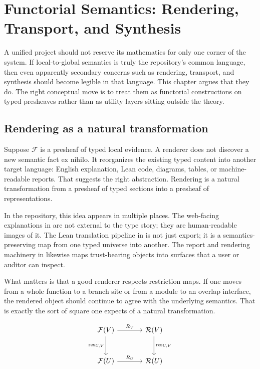 \chapter{Functorial Semantics: Rendering, Transport, and Synthesis}

A unified project should not reserve its mathematics for only one corner of the system. If
local-to-global semantics is truly the repository's common language, then even apparently
secondary concerns such as rendering, transport, and synthesis should become legible in that
language. This chapter argues that they do. The right conceptual move is to treat them as
functorial constructions on typed presheaves rather than as utility layers sitting outside
the theory.

\section*{Rendering as a natural transformation}
Suppose \(\mathcal{F}\) is a presheaf of typed local evidence. A renderer does not discover a
new semantic fact ex nihilo. It reorganizes the existing typed content into another target
language: English explanation, Lean code, diagrams, tables, or machine-readable reports.
That suggests the right abstraction. Rendering is a natural transformation from a presheaf of
typed sections into a presheaf of representations.

In the repository, this idea appears in multiple places. The web-facing explanations in
 are not external to the type story; they are human-readable images of it. The
Lean translation pipeline in  is not just export; it
is a semantics-preserving map from one typed universe into another. The report and rendering
machinery in  likewise maps trust-bearing objects into surfaces that a
user or auditor can inspect.

What matters is that a good renderer respects restriction maps. If one moves from a whole
function to a branch site or from a module to an overlap interface, the rendered object
should continue to agree with the underlying semantics. That is exactly the sort of square
one expects of a natural transformation.

\[
\begin{tikzcd}[column sep=large, row sep=large]
\mathcal{F}(V) \arrow[r, "R_V"] \arrow[d, "\mathrm{res}_{U,V}"'] & \mathcal{R}(V) \arrow[d, "\mathrm{res}_{U,V}"] \\
\mathcal{F}(U) \arrow[r, "R_U"] & \mathcal{R}(U)
\end{tikzcd}
\]

